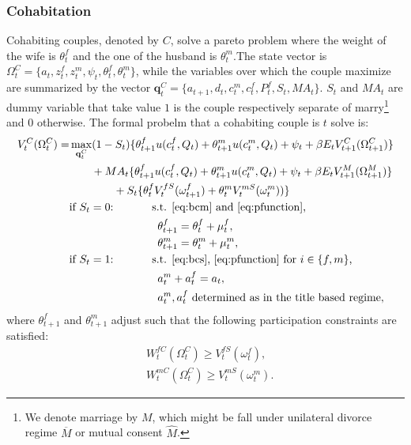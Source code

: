 \documentclass[12pt]{article}
\numberwithin{table}{section}
\begin{document}
\subsubsection*{Cohabitation}
Cohabiting couples, denoted by $C$, solve a pareto problem where the weight of the wife is $\theta^f_t$ and the one of the husband is $\theta^m_t$.The state vector is $\Omega^{C}_t=\{a_t,z^f_t,z^m_t,\psi_t,\theta^f_t,\theta^m_t\}$, while the variables over which the couple maximize are summarized by the vector $\mathbf{q}^C_t=\{a_{t+1},d_t,c^m_t,c^f_t,P^f_t,S_t,MA_t\}$. $S_t$ and ${MA}_t$ are dummy variable that take value $1$ is the couple respectively separate of marry\footnote{We denote marriage by $M$, which might be fall under unilateral divorce regime $\overline{M}$ or mutual consent $\hat{M}$.} and 0 otherwise. The formal probelm that a cohabiting couple is $t$ solve is:
\begin{equation}\label{eq:v_coh}
\begin{split}
V_t^{C}(\Omega^{C}_t)=&\max_{\mathbf{q}^C_t} (1-S_t)\{\theta^f_{t+1} u(c^f_t,Q_t)+\theta^m_{t+1} u(c^m_t,Q_t)+\psi_t+\beta E_t V^{C}_{t+1}(\Omega^{C}_{t+1})\}
\\ &\quad\quad+MA_t\{\theta^f_{t+1} u(c^f_t,Q_t)+\theta^m_{t+1} u(c^m_t,Q_t)+\psi_t+\beta E_t V^{M}_{t+1}(\Omega^{M}_{t+1})\}\\ &\quad\quad\quad\quad+S_t \{\theta^f_{t}V^{fS}_{t}(\omega^{f}_{t+1})+\theta^m_{t} V^{mS}_{t}(\omega^{m}_{t}))\}
\\ &\text{if $S_t=0$:}\hspace{35pt}\text{s.t. \eqref{eq:bcm} and \eqref{eq:pfunction},}\\ &\hspace{80pt}
\theta^f_{t+1}=\theta^f_{t}+\mu^f_t,\\ &\hspace{80pt}
\theta^m_{t+1}=\theta^m_{t}+\mu^m_t,
\\ &\text{if $S_t=1$:}\hspace{35pt}\text{s.t. \eqref{eq:bcs}, \eqref{eq:pfunction} for $i\in\{f,m\}$,}\\ &
\hspace{80pt}a_t^m+a_t^f= a_t,	\\ &
\hspace{80pt}a_t^m,a_t^f\text{ determined as in the title based regime},
\end{split}
\end{equation}
where $\theta^f_{t+1}$ and $\theta^m_{t+1}$ adjust such that the following participation constraints are satisfied:
\begin{equation}\label{eq:p_cons_coh}
\begin{split}
&
W^{fC}_{t}(\Omega^{C}_{t})\geq V_{t}^{fS}(\omega^f_{t}),\\ &
W^{mC}_{t}(\Omega^{C}_{t})\geq V_{t}^{mS}(\omega^m_{t}). 
\end{split}
\end{equation}
\end{document}

